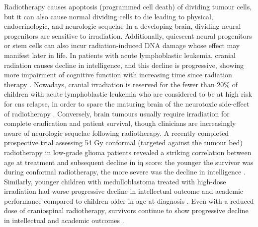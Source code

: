 Radiotherapy causes apoptosis (programmed cell death) of dividing tumour cells, but it can also cause normal dividing cells to die leading to physical, endocrinologic, and neurologic sequelae In a developing brain, dividing neural progenitors are sensitive to irradiation. Additionally, quiescent neural progenitors or stem cells can also incur radiation-induced DNA damage whose effect may manifest later in life. In patients with acute lymphoblastic leukemia, cranial radiation causes decline in intelligence, and this decline is progressive, showing more impairment of cognitive function with increasing time since radiation therapy . Nowadays, cranial irradiation is reserved for the fewer than 20\% of children with acute lymphoblastic leukemia who are considered to be at high risk for \gls{cns} relapse, in order to spare the maturing brain of the neurotoxic side-effect of radiotherapy . Conversely, brain tumours usually require irradiation for complete eradication and patient survival, though clinicians are increasingly aware of neurologic sequelae following radiotherapy. A recently completed prospective trial assessing 54 Gy conformal (targeted against the tumour bed) radiotherapy in low-grade glioma patients revealed a striking correlation between age at treatment and subsequent decline in \gls{iq} score: the younger the survivor was during conformal radiotherapy, the more severe was the decline in intelligence . Similarly, younger children with medulloblastoma treated with high-dose irradiation had worse progressive decline in intellectual outcome and academic performance compared to children older in age at diagnosis . Even with a reduced dose of craniospinal radiotherapy, survivors continue to show progressive decline in intellectual and academic outcomes .

